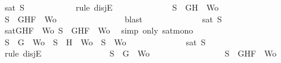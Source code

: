 \begin{isabellebody}
\ {\isachardoublequoteopen}sat\ S{\isachardoublequoteclose}\isanewline
\ \ \ \ \ \ \ \ \ \ \isamarkupfalse%
\ {\isacharparenleft}rule\ disjE{\isacharparenright}\isanewline
\ \ \ \ \ \ \ \ \ \ \ \ \isamarkupfalse%
\ {\isachardoublequoteopen}S\ {\isacharequal}\ {\isacharbraceleft}G{\isacharcomma}H{\isacharbraceright}\ {\isasymunion}\ Wo{\isachardoublequoteclose}\isanewline
\ \ \ \ \ \ \ \ \ \ \ \ \isamarkupfalse%
\ \isamarkupfalse%
\ {\isachardoublequoteopen}S\ {\isasymsubseteq}\ {\isacharbraceleft}G{\isacharcomma}H{\isacharcomma}F{\isacharbraceright}\ {\isasymunion}\ Wo{\isachardoublequoteclose}\isanewline
\ \ \ \ \ \ \ \ \ \ \ \ \ \ \isamarkupfalse%
\ blast\isanewline
\ \ \ \ \ \ \ \ \ \ \ \ \isamarkupfalse%
\ {\isachardoublequoteopen}sat\ S{\isachardoublequoteclose}\isanewline
\ \ \ \ \ \ \ \ \ \ \ \ \ \ \isamarkupfalse%
\ {\isacartoucheopen}sat{\isacharparenleft}{\isacharbraceleft}G{\isacharcomma}H{\isacharcomma}F{\isacharbraceright}\ {\isasymunion}\ Wo{\isacharparenright}{\isacartoucheclose}\ {\isacartoucheopen}S\ {\isasymsubseteq}\ {\isacharbraceleft}G{\isacharcomma}H{\isacharcomma}F{\isacharbraceright}\ {\isasymunion}\ Wo{\isacartoucheclose}\ \isamarkupfalse%
\ {\isacharparenleft}simp\ only{\isacharcolon}\ sat{\isacharunderscore}mono{\isacharparenright}\isanewline
\ \ \ \ \ \ \ \ \ \ \isamarkupfalse%
\isanewline
\ \ \ \ \ \ \ \ \ \ \ \ \isamarkupfalse%
\ {\isachardoublequoteopen}S\ {\isacharequal}\ {\isacharbraceleft}G{\isacharbraceright}\ {\isasymunion}\ Wo\ {\isasymor}\ S\ {\isacharequal}\ {\isacharbraceleft}H{\isacharbraceright}\ {\isasymunion}\ Wo\ {\isasymor}\ S\ {\isacharequal}\ Wo{\isachardoublequoteclose}\isanewline
\ \ \ \ \ \ \ \ \ \ \ \ \isamarkupfalse%
\ {\isachardoublequoteopen}sat\ S{\isachardoublequoteclose}\isanewline
\ \ \ \ \ \ \ \ \ \ \ \ \isamarkupfalse%
\ {\isacharparenleft}rule\ disjE{\isacharparenright}\isanewline
\ \ \ \ \ \ \ \ \ \ \ \ \ \ \isamarkupfalse%
\ {\isachardoublequoteopen}S\ {\isacharequal}\ {\isacharbraceleft}G{\isacharbraceright}\ {\isasymunion}\ Wo{\isachardoublequoteclose}\isanewline
\ \ \ \ \ \ \ \ \ \ \ \ \ \ \isamarkupfalse%
\ \isamarkupfalse%
\ {\isachardoublequoteopen}S\ {\isasymsubseteq}\ {\isacharbraceleft}G{\isacharcomma}H{\isacharcomma}F{\isacharbraceright}\ {\isasymunion}\ Wo{\isachardoublequoteclose}\isanewline
\ \ \ \ \ \ \ \ \ \ \ \ \ \ \ \ \isamarkupfalse%

\end{isabellebody}
